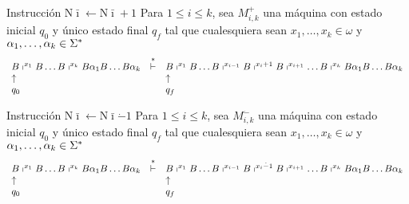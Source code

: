 \begin{frame}
	\begin{block}{Instrucción $\mathrm{N}\bar{\imath} \leftarrow \mathrm{N}\bar{\imath} + 1$}
		\PN Para $1 \leq i \leq k$, sea $M_{i,k}^{+}$ una máquina con estado inicial $q_{0}$ y único estado final $q_{f}$
		tal que cualesquiera sean $x_{1}, \dotsc, x_{k} \in \omega$ y $\alpha_{1}, \dotsc, \alpha_{k} \in \Sigma^{\ast}$
		\sizeOfLetterFirst
		\[
			\begin{array}{lcl}
				B \shortmid^{x_{1}} B \dotsc B \shortmid^{x_{k}} B \alpha_{1} B \dotsc B \alpha_{k} &\overset{\ast}{\vdash}& B
				\shortmid^{x_{1}} B \dotsc B \shortmid^{x_{i-1}} B \shortmid^{x_{i}+1} B \shortmid^{x_{i+1}} \dotsc B
				\shortmid^{x_{k}} B \alpha_{1} B \dotsc B \alpha_{k} \\
				\uparrow && \uparrow \\
				q_{0} & & q_{f}
			\end{array}
		\]
	\end{block}

	\begin{block}{Instrucción $\mathrm{N}\bar{\imath} \leftarrow \mathrm{N}\bar{\imath} \dot{-} 1$}
		\PN Para $1 \leq i \leq k$, sea $M_{i,k}^{\dot{-}}$ una máquina con estado inicial $q_{0}$ y único estado final
		$q_{f}$ tal que cualesquiera sean $x_{1}, \dotsc, x_{k} \in \omega$ y $\alpha_{1}, \dotsc, \alpha_{k} \in \Sigma^{\ast}$
		\sizeOfLetterFirst
		\[
			\begin{array}{lcl}
				B \shortmid^{x_{1}} B \dotsc B \shortmid^{x_{k}} B \alpha_{1} B \dotsc B \alpha_{k} &\overset{\ast}{\vdash}& B
					\shortmid^{x_{1}} B \dotsc B \shortmid^{x_{i-1}} B \shortmid^{x_{i} \dot{-} 1} B \shortmid^{x_{i+1}} \dotsc B
					\shortmid^{x_{k}} B \alpha_{1} B \dotsc B \alpha_{k} \\
				\uparrow && \uparrow \\
				q_{0} && q_{f}
			\end{array}
		\]
	\end{block}
\end{frame}

